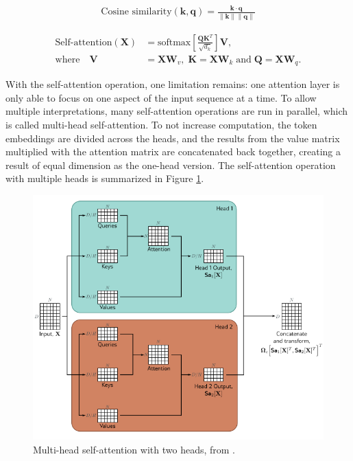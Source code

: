 \documentclass{article}
\begin{document}
\begin{align}
    \text{Cosine similarity}(\mathbf{k}, \mathbf{q}) = \frac{\mathbf{k} \cdot \mathbf{q}}{\|\mathbf{k}\| \|\mathbf{q}\|}
    \label{eq:cos-similarity}
\end{align}

\begin{align}
    \text{Self-attention}(\mathbf{X}) &= \text{softmax} \left[ \frac{\mathbf{Q}\mathbf{K}^T }{\sqrt{d_k}} \right] \mathbf{V}, \label{eq:self-attention} \\
    \nonumber\text{where} \quad \mathbf{V} &= \mathbf{X} \mathbf{W}_v, \; \mathbf{K} = \mathbf{X} \mathbf{W}_k \; \text{and} \; \mathbf{Q} = \mathbf{X} \mathbf{W}_q.
\end{align}

With the self-attention operation, one limitation remains: one attention layer is only able to focus on one aspect of the 
input sequence at a time. To allow multiple interpretations, many self-attention operations are run in parallel, which is 
called multi-head self-attention. To not increase computation, the token embeddings are divided across the heads, and the 
results from the value matrix multiplied with the attention matrix are concatenated back together, creating a result of 
equal dimension as the one-head version. The self-attention operation with multiple heads is summarized in Figure \ref{fig:multi-head-self-attention}.

\begin{figure}[h]
    \centering
    \includegraphics*[scale=0.6]{../images/multiheadattention.png}
    \caption{Multi-head self-attention with two heads, from \cite{princebook}.}
    \label{fig:multi-head-self-attention}
\end{figure}
\end{document}
